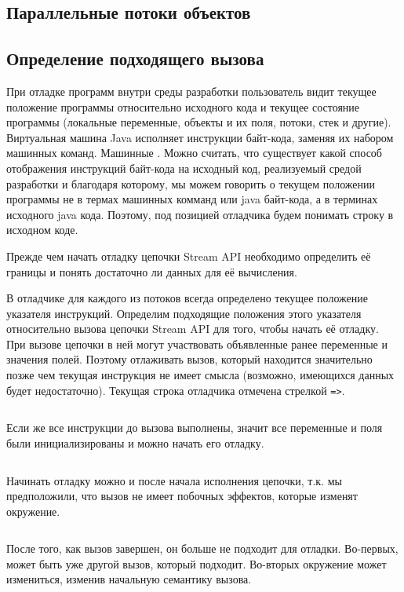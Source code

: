 \subsection{Параллельные потоки объектов}


\subsection{Определение подходящего вызова}
При отладке программ внутри среды разработки пользователь видит текущее положение программы относительно исходного кода и текущее состояние программы (локальные переменные, объекты и их поля, потоки, стек и другие). Виртуальная машина Java исполняет инструкции байт-кода, заменяя их набором машинных команд. Машинные . Можно считать, что существует какой способ отображения инструкций байт-кода на исходный код, реализуемый средой разработки и благодаря которому, мы можем говорить о текущем положении программы не в термах машинных комманд или java байт-кода, а в терминах исходного java кода. Поэтому, под позицией отладчика будем понимать строку в исходном коде.

Прежде чем начать отладку цепочки Stream API необходимо определить её границы и понять достаточно ли данных для её вычисления.

В отладчике для каждого из потоков всегда определено текущее положение указателя инструкций. Определим подходящие положения этого указателя относительно вызова цепочки Stream API для того, чтобы начать её отладку. При вызове цепочки в ней могут участвовать объявленные ранее переменные и значения полей. Поэтому отлаживать вызов, который находится значительно позже чем текущая инструкция не имеет смысла (возможно, имеющихся данных будет недостаточно). Текущая строка отладчика отмечена стрелкой \texttt{=>}.

\inputminted{java}{chapter2/code/FarToCall.java}

Если же все инструкции до вызова выполнены, значит все переменные и поля были инициализированы и можно начать его отладку. 

\inputminted{java}{chapter2/code/BeforeCall.java}

Начинать отладку можно и после начала исполнения цепочки, т.к. мы предположили, что вызов не имеет побочных эффектов, которые изменят окружение.
\inputminted{java}{chapter2/code/InEvaluation.java}

После того, как вызов завершен, он больше не подходит для отладки. Во-первых, может быть уже другой вызов, который подходит. Во-вторых окружение может измениться, изменив начальную семантику вызова.
\inputminted{java}{chapter2/code/AfterCall.java}

